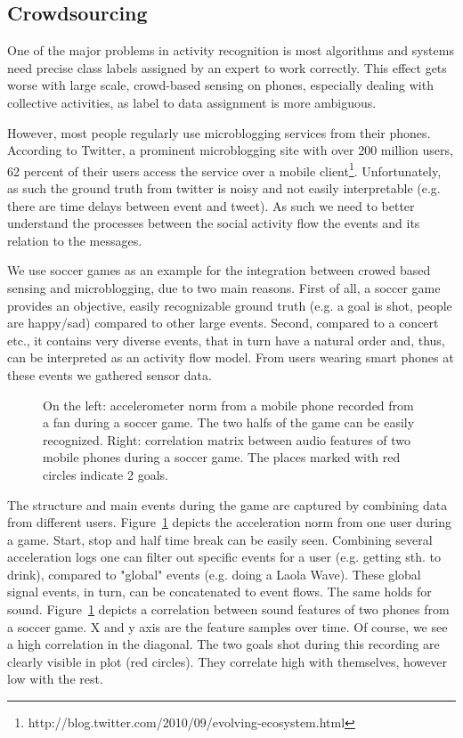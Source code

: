\subsection{Crowdsourcing}

One of the major problems in activity recognition is most algorithms
and systems need precise class labels assigned by an expert to work
correctly. This effect gets worse with large scale, crowd-based sensing
on phones, especially dealing with collective activities, 
as label to data assignment is more ambiguous.

However, most people regularly use microblogging services from their phones.
According to Twitter, a prominent microblogging site
with over 200 million users, 62 percent of their users
access the service over a mobile client\footnote{http://blog.twitter.com/2010/09/evolving-ecosystem.html}.
Unfortunately, as such the ground truth from twitter is noisy and
not easily interpretable (e.g. there are time delays between event and tweet).
As such we need to better understand the processes between the social activity flow the events
and its relation to the messages. 

We use soccer games as an example for the integration between crowed based sensing and
microblogging, due to two main reasons. First of all, a soccer game 
provides an objective, easily recognizable ground truth (e.g. a goal is shot, people are happy/sad)
compared to other large events. Second, compared to a concert etc., it contains very diverse events,
that in turn have a natural order and, thus, can be interpreted as an activity flow model. 
From users wearing smart phones at these events we gathered sensor data. 

\begin{figure}[t]
\caption[Soccer game sound and acceleration]{On the left: accelerometer norm from a mobile phone recorded from a fan during a soccer game. The two halfs of the game
can be easily recognized. Right: correlation matrix between audio features of two mobile phones during a soccer game. The places marked 
with red circles indicate 2 goals. }
\label{fig:acceleration}
\end{figure}

The structure and main events during the game are captured by combining data from different users.
Figure~\ref{fig:acceleration} depicts the acceleration norm from one user during a game. Start, stop and half time break 
can be easily seen. Combining several acceleration logs one can filter out specific events for a user
(e.g. getting sth. to drink), compared to "global" events (e.g. doing a Laola Wave). These global signal events, in turn, can
be concatenated to event flows. The same holds for sound. Figure~\ref{fig:acceleration} 
depicts a correlation between sound features of two phones from a soccer game. 
X and y axis are the feature samples over time. Of course, we see a high correlation in the diagonal. 
The two goals shot during this recording are clearly visible in plot (red circles). They correlate high with themselves, however low with the rest.


